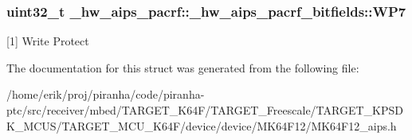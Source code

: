 \subsubsection[{\texorpdfstring{W\+P7}{WP7}}]{\setlength{\rightskip}{0pt plus 5cm}uint32\+\_\+t \+\_\+hw\+\_\+aips\+\_\+pacrf\+::\+\_\+hw\+\_\+aips\+\_\+pacrf\+\_\+bitfields\+::\+W\+P7}\hypertarget{struct__hw__aips__pacrf_1_1__hw__aips__pacrf__bitfields_a12d723740340c5c99d585a01b0592095}{}\label{struct__hw__aips__pacrf_1_1__hw__aips__pacrf__bitfields_a12d723740340c5c99d585a01b0592095}
\mbox{[}1\mbox{]} Write Protect 

The documentation for this struct was generated from the following file\+:\begin{DoxyCompactItemize}
\item 
/home/erik/proj/piranha/code/piranha-\/ptc/src/receiver/mbed/\+T\+A\+R\+G\+E\+T\+\_\+\+K64\+F/\+T\+A\+R\+G\+E\+T\+\_\+\+Freescale/\+T\+A\+R\+G\+E\+T\+\_\+\+K\+P\+S\+D\+K\+\_\+\+M\+C\+U\+S/\+T\+A\+R\+G\+E\+T\+\_\+\+M\+C\+U\+\_\+\+K64\+F/device/device/\+M\+K64\+F12/M\+K64\+F12\+\_\+aips.\+h\end{DoxyCompactItemize}
